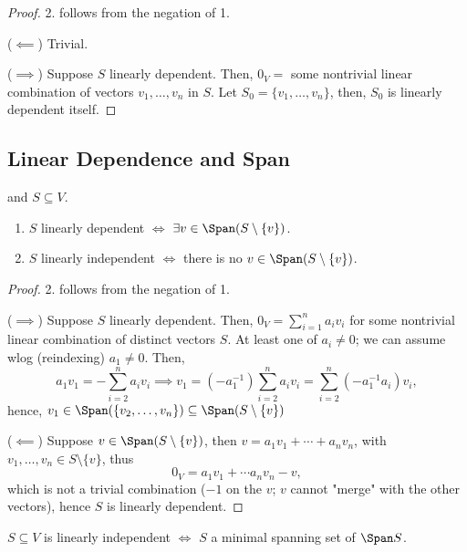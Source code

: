 \begin{proof}
    2. follows from the negation of 1.

    \noindent($\impliedby$) Trivial.

    \noindent($\implies$) Suppose $S$ linearly dependent. Then, $0_V = $ some nontrivial linear combination of vectors $v_1, \dots, v_n$ in $S$. Let $S_0 = \{v_1, \dots, v_n\}$, then, $S_0$ is linearly dependent itself.
\end{proof}

\subsection{Linear Dependence and Span}

\begin{proposition}\label{prop:dependentprop1}
     and $S \subseteq V$.
    \begin{enumerate}
        \item $S$ linearly dependent $\iff$ $\exists v \in \Span (S \setminus \{v\})$.
        \item $S$ linearly independent $\iff$ there is no $v \in \Span (S \setminus \{v\})$.
    \end{enumerate} 
\end{proposition}

\begin{proof}
    2. follows from the negation of 1.

    \noindent($\implies$) Suppose $S$ linearly dependent. Then, $0_V = \sum_{i=1}^n a_i v_i$ for some nontrivial linear combination of distinct vectors $S$. At least one of $a_i \neq 0$; we can assume wlog (reindexing) $a_1 \neq 0$. Then, 
    \[
    a_1 v_1 = -\sum_{i=2}^n a_i v_i \implies v_1 = (-a_1^{-1}) \sum_{i=2}^n a_iv_i = \sum_{i=2}^{n} (-a_1^{-1}a_i)v_i,
    \]
    hence, $v_1 \in \Span (\{v_2, \dots, v_n\}) \subseteq \Span (S \setminus \{v \})$

    \noindent ($\impliedby$) Suppose $v \in \Span (S \setminus \{v\})$, then $v = a_1 v_1 + \cdots + a_n v_n$, with $v_1, \dots, v_n \in S \setminus \{v\}$, thus \[
    0_V = a_1 v_1 + \cdots a_n v_n - v,    
    \]
    which is not a trivial combination ($-1$ on the $v$; $v$ cannot "merge" with the other vectors), hence $S$ is linearly dependent.
\end{proof}

\begin{corollary}\label{cor:minspanninglin}
    $S \subseteq V$ is linearly independent $\iff$ $S$ a minimal spanning set of $\Span S$.
\end{corollary}


